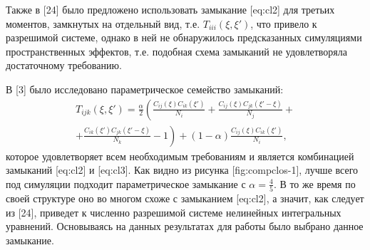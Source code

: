 Также в [24] было предложено использовать замыкание [eq:cl2] для третьих моментов, замкнутых на отдельный вид, т.е. $ T_{iii}(\xi,\xi') $, что привело к разрешимой системе, однако в ней не обнаружилось предсказанных симуляциями пространственных эффектов, т.е. подобная схема замыканий не удовлетворяла достаточному требованию.

В [3] было исследовано параметрическое семейство замыканий:
\begin{multline}\label{eq:closure}
T_{ijk}(\xi,\xi')	=	\frac{\alpha}{2}\left(\frac{C_{ij}(\xi)C_{ik}(\xi')}{N_{i}}+\frac{C_{ij}(\xi)C_{jk}(\xi'-\xi)}{N_{j}}+\right.\\
\left.+\frac{C_{ik}(\xi')C_{jk}(\xi'-\xi)}{N_{k}}-1\right)+(1-\alpha)\frac{C_{ij}(\xi)C_{ik}(\xi')}{N_{i}},
\end{multline}
которое удовлетворяет всем необходимым требованиям и является комбинацией замыканий [eq:cl2] и [eq:cl3]. Как видно из рисунка [fig:compclos-1], лучше всего под симуляции подходит параметрическое замыкание с $ \alpha=\frac{4}{5} $. В то же время по своей структуре оно во многом схоже с замыканием [eq:cl2], а значит, как следует из [24], приведет к численно разрешимой системе нелинейных интегральных уравнений. Основываясь на данных результатах для работы было выбрано данное замыкание.